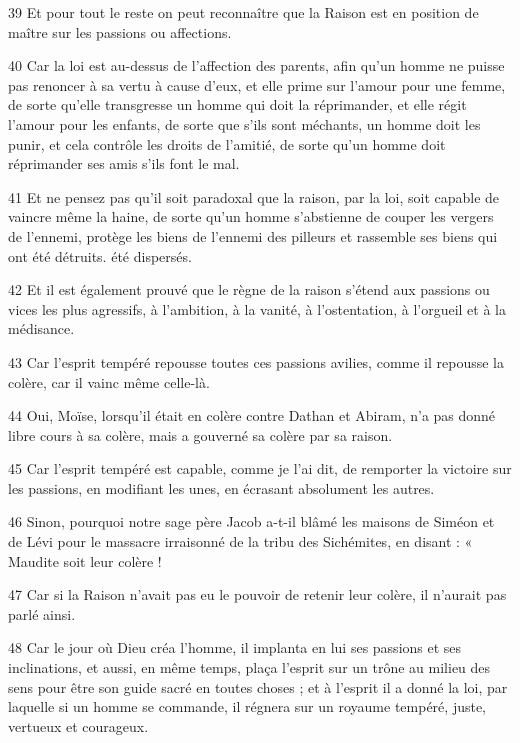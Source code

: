 \par 39 Et pour tout le reste on peut reconnaître que la Raison est en position de maître sur les passions ou affections.

\par 40 Car la loi est au-dessus de l'affection des parents, afin qu'un homme ne puisse pas renoncer à sa vertu à cause d'eux, et elle prime sur l'amour pour une femme, de sorte qu'elle transgresse un homme qui doit la réprimander, et elle régit l'amour pour les enfants, de sorte que s'ils sont méchants, un homme doit les punir, et cela contrôle les droits de l'amitié, de sorte qu'un homme doit réprimander ses amis s'ils font le mal.

\par 41 Et ne pensez pas qu'il soit paradoxal que la raison, par la loi, soit capable de vaincre même la haine, de sorte qu'un homme s'abstienne de couper les vergers de l'ennemi, protège les biens de l'ennemi des pilleurs et rassemble ses biens qui ont été détruits. été dispersés.

\par 42 Et il est également prouvé que le règne de la raison s'étend aux passions ou vices les plus agressifs, à l'ambition, à la vanité, à l'ostentation, à l'orgueil et à la médisance.

\par 43 Car l'esprit tempéré repousse toutes ces passions avilies, comme il repousse la colère, car il vainc même celle-là.

\par 44 Oui, Moïse, lorsqu'il était en colère contre Dathan et Abiram, n'a pas donné libre cours à sa colère, mais a gouverné sa colère par sa raison.

\par 45 Car l'esprit tempéré est capable, comme je l'ai dit, de remporter la victoire sur les passions, en modifiant les unes, en écrasant absolument les autres.

\par 46 Sinon, pourquoi notre sage père Jacob a-t-il blâmé les maisons de Siméon et de Lévi pour le massacre irraisonné de la tribu des Sichémites, en disant : « Maudite soit leur colère !

\par 47 Car si la Raison n'avait pas eu le pouvoir de retenir leur colère, il n'aurait pas parlé ainsi.

\par 48 Car le jour où Dieu créa l'homme, il implanta en lui ses passions et ses inclinations, et aussi, en même temps, plaça l'esprit sur un trône au milieu des sens pour être son guide sacré en toutes choses ; et à l'esprit il a donné la loi, par laquelle si un homme se commande, il régnera sur un royaume tempéré, juste, vertueux et courageux.

